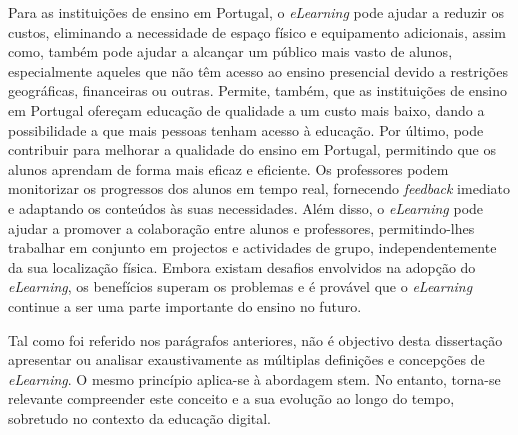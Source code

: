 Para as instituições de ensino em Portugal, o \textit{eLearning} pode ajudar a reduzir os custos, eliminando a necessidade de espaço físico e equipamento adicionais, assim como, também pode ajudar a alcançar um público mais vasto de alunos, especialmente aqueles que não têm acesso ao ensino presencial devido a restrições geográficas, financeiras ou outras. Permite, também, que as instituições de ensino em Portugal ofereçam educação de qualidade a um custo mais baixo, dando a possibilidade a que mais pessoas tenham acesso à educação. Por último, pode contribuir para melhorar a qualidade do ensino em Portugal, permitindo que os alunos aprendam de forma mais eficaz e eficiente. Os professores podem monitorizar os progressos dos alunos em tempo real, fornecendo \textit{feedback} imediato e adaptando os conteúdos às suas necessidades. Além disso, o \textit{eLearning} pode ajudar a promover a colaboração entre alunos e professores, permitindo-lhes trabalhar em conjunto em projectos e actividades de grupo, independentemente da sua localização física. Embora existam desafios envolvidos na adopção do \textit{eLearning}, os benefícios superam os problemas e é provável que o \textit{eLearning} continue a ser uma parte importante do ensino no futuro.

Tal como foi referido nos parágrafos anteriores, não é objectivo desta dissertação apresentar ou analisar exaustivamente as múltiplas definições e concepções de \textit{eLearning}. O mesmo princípio aplica-se à abordagem \acrshort{stem}. No entanto, torna-se relevante compreender este conceito e a sua evolução ao longo do tempo, sobretudo no contexto da educação digital.

